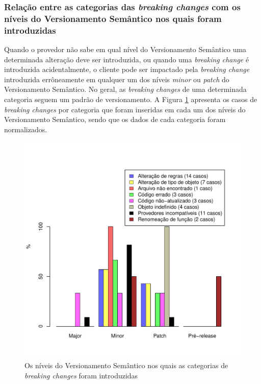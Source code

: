 \subsubsection{Relação entre as categorias das \textit{breaking changes} com os níveis do Versionamento Semântico nos quais foram introduzidas}

Quando o provedor não sabe em qual nível do Versionamento Semântico uma determinada alteração deve ser introduzida, ou quando uma \textit{breaking change} é introduzida acidentalmente, o cliente pode ser impactado pela \textit{breaking change} introduzida  errôneamente em qualquer um dos níveis \textit{minor} ou \textit{patch} do Versionamento Semântico. No geral, as \textit{breaking changes} de uma determinada categoria seguem um padrão de versionamento. A Figura \ref{fig:semver_types} apresenta os casos de \textit{breaking changes} por categoria que foram inseridas em cada um dos níveis do Versionamento Semântico, sendo que os dados de cada categoria foram normalizados. 

\begin{figure}[!h]
	\centering
	\includegraphics[scale=0.65]{figuras/semver_types.pdf}
	\caption{Os níveis do Versionamento Semântico nos quais as categorias de \textit{breaking changes} foram introduzidas}
	\label{fig:semver_types}
\end{figure}{}

